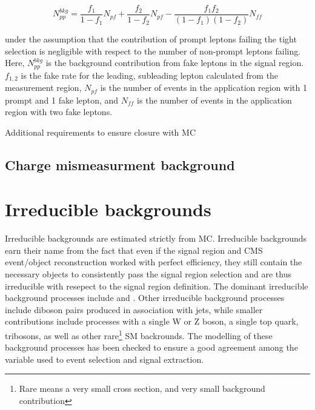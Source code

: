 \begin{equation}
\label{eqn:fake_rate}
  N_{pp}^{bkg} = \frac{f_{1}}{1-f_{1}}N_{pf} + \frac{f_{2}}{1-f_{2}}N_{pf} - \frac{f_{1}f_{2}}{(1-f_{1})(1-f_{2})}N_{ff}
\end{equation}

\noindent under the assumption that the contribution of prompt leptons failing the tight selection is negligible with respect to the number of non-prompt leptons failing. Here, $N_{pp}^{bkg}$ is the background contribution from fake leptons
in the signal region. $f_{1,2}$ is the fake rate for the leading, subleading lepton calculated from the measurement region, $N_{pf}$ is the number of events in the application region with 1 prompt and 1 fake lepton, and $N_{ff}$ is the
number of events in the application region with two fake leptons. 

Additional requirements to ensure closure with \ttbar MC  

\subsection{Charge mismeasurment background}

\section{Irreducible backgrounds}
Irreducible backgrounds are estimated strictly from MC. Irreducible backgrounds earn their name from the fact that even if the signal region and CMS event/object reconstruction
worked with perfect efficiency, they still contain the necessary objects to consistently pass the signal region selection and are thus irreducible with resepect to the signal
region definition. The dominant irreducible background processes include \ttw and \ttz. Other irreducible background processes include diboson pairs produced in association with jets,
while smaller contributions include processes with a single W or Z boson, a single top quark, tribosons, as well as other rare\footnote{Rare means a very small cross section, and very
small background contribution} SM backrounds. The modelling of these background processes has been checked to ensure a good agreement among the variable used to event selection and
signal extraction.  


